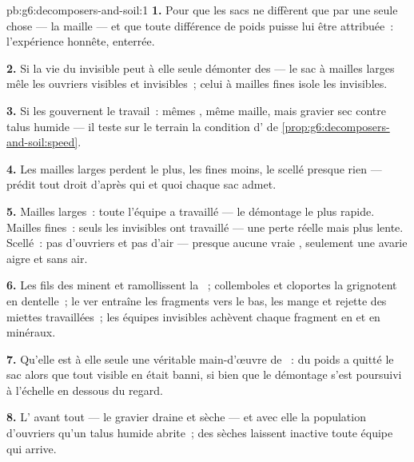 \begin{solution}{pb:g6:decomposers-and-soil:1}
\textbf{1.} Pour que les sacs ne diffèrent que par une seule chose
--- la maille --- et que toute différence de poids puisse lui être
attribuée~: l'expérience honnête, enterrée.

\textbf{2.} Si la vie du  invisible peut à elle seule démonter
des  --- le sac à mailles larges mêle les ouvriers visibles
et invisibles~; celui à mailles fines isole les invisibles.

\textbf{3.} Si les  gouvernent le travail~: mêmes
, même maille, mais gravier sec contre talus humide --- il
teste sur le terrain la condition d' de
\cref{prop:g6:decomposers-and-soil:speed}.

\textbf{4.} Les mailles larges perdent le plus, les fines moins, le
scellé presque rien --- prédit tout droit d'après qui et quoi chaque
sac admet.

\textbf{5.} Mailles larges~: toute l'équipe a travaillé --- le
démontage le plus rapide. Mailles fines~: seuls les invisibles ont
travaillé --- une perte réelle mais plus lente. Scellé~: pas
d'ouvriers et pas d'air --- presque aucune vraie ,
seulement une avarie aigre et sans air.

\textbf{6.} Les fils des  minent et ramollissent la
~; collemboles et cloportes la grignotent en dentelle~; le
ver entraîne les fragments vers le bas, les mange et rejette des
miettes travaillées~; les équipes invisibles achèvent chaque
fragment en  et en minéraux.

\textbf{7.} Qu'elle est à elle seule une véritable main-d'œuvre de
~: du poids a quitté le sac alors que tout 
visible en était banni, si bien que le démontage s'est poursuivi à
l'échelle en dessous du regard.

\textbf{8.} L' avant tout --- le gravier draine et sèche ---
et avec elle la population d'ouvriers qu'un talus humide abrite~;
des  sèches laissent inactive toute équipe qui arrive.


\end{solution}
